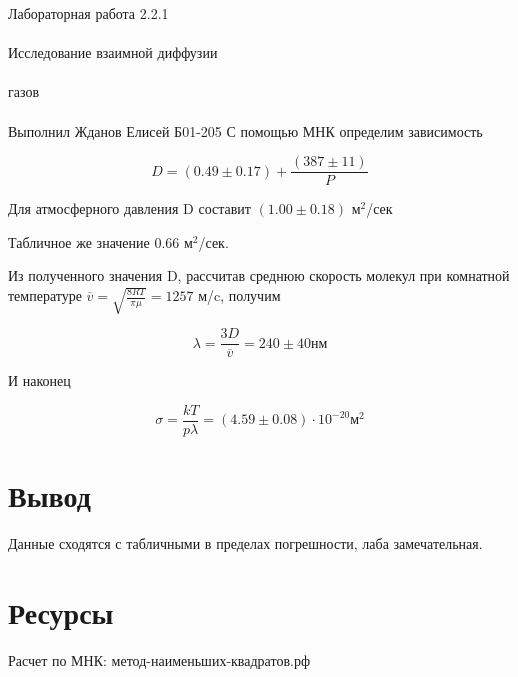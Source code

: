 \documentclass{astroedu-lab}
\begin{document}
\begin{problem}{\huge Лабораторная работа 2.2.1\\\\Исследование взаимной диффузии\\\\газов\\\\Выполнил Жданов Елисей Б01-205}
С помощью МНК определим зависимость

\begin{equation}
	D = (0.49 \pm 0.17) + \frac{(387 \pm 11)}{P}
\end{equation}

Для атмосферного давления D составит $(1.00 \pm 0.18)$ м$^2$/сек

Табличное же значение 0.66 м$^2$/сек.

Из полученного значения D, рассчитав среднюю скорость молекул при комнатной температуре $\overline{v} = \sqrt{\frac{8 R T}{\pi \mu}} = 1257$ м/c, получим 

\begin{equation}
	\lambda = \frac{3 D}{\overline{v}} = 240 \pm 40 нм
\end{equation}

И наконец

\begin{equation}
	\sigma = \frac{k T}{p \lambda} = (4.59 \pm 0.08) \cdot 10^{-20} \text{м}^2
\end{equation}


\section{Вывод}
Данные сходятся с табличными в пределах погрешности, лаба замечательная.

\section{Ресурсы}

Расчет по МНК: метод-наименьших-квадратов.рф


\end{problem}
\end{document}
